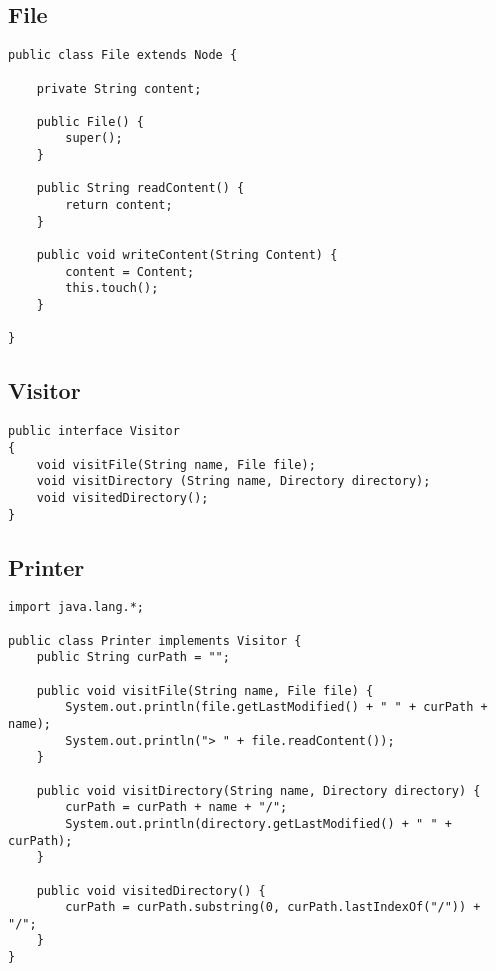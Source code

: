 \documentclass[a4paper]{article}
\begin{document}
\subsection*{File}

\begin{lstlisting}
public class File extends Node {

	private String content;

	public File() {
		super();
	}

	public String readContent() {
		return content;
	}

	public void writeContent(String Content) {
		content = Content;
		this.touch();
	}

}
\end{lstlisting}

\subsection*{Visitor}

\begin{lstlisting}
public interface Visitor 
{
	void visitFile(String name, File file);
	void visitDirectory (String name, Directory directory);
	void visitedDirectory();
}
\end{lstlisting}

\subsection*{Printer}

\begin{lstlisting}
import java.lang.*;

public class Printer implements Visitor {
	public String curPath = "";

	public void visitFile(String name, File file) {
		System.out.println(file.getLastModified() + " " + curPath + name);
		System.out.println("> " + file.readContent());
	}

	public void visitDirectory(String name, Directory directory) {
		curPath = curPath + name + "/";
		System.out.println(directory.getLastModified() + " " + curPath);
	}

	public void visitedDirectory() {
		curPath = curPath.substring(0, curPath.lastIndexOf("/")) + "/";
	}
}
\end{lstlisting}
\end{document}
